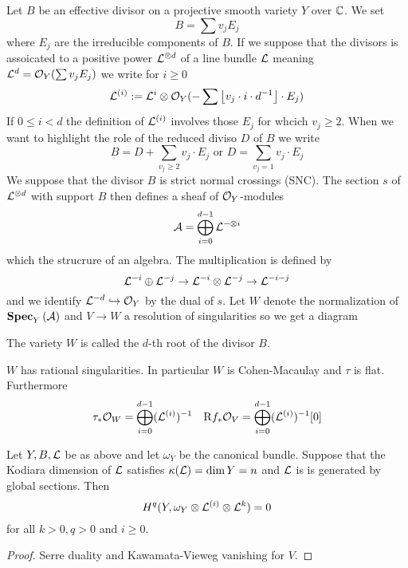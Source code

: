 \documentclass[12pt]{article}
\newcommand{\R}{\mathrm{R}}
\begin{document}
Let $B$ be an effective divisor on a projective smooth variety $Y$ over $\mathbb{C}$. We set
\[ B = \sum v_j E_j \]
where $E_j$ are the irreducible components of $B$. If we suppose that the divisors is assoicated to a positive power $\mathcal{L}^{\otimes d}$ of a line bundle $\mathcal{L}$ meaning $\mathcal{L}^d = \mathcal{O}_{Y}(\sum v_j E_j)$ we write for $i \ge 0$
\[ \mathcal{L}^{(i)} := \mathcal{L}^i \otimes \mathcal{O}_{Y}(-\sum \left\lfloor  v_j \cdot i \cdot d^{-1} \right\rfloor \cdot E_j) \]
If $0 \le i < d$ the definition of $\mathcal{L}^{(i)}$ involves those $E_j$ for whcich $v_j \ge 2$. When we want to highlight the role of the reduced diviso $D$ of $B$ we write
\[ B = D + \sum_{v_j \ge 2} v_j \cdot E_j \text{ or } D = \sum_{v_j = 1} v_j \cdot E_j \]
We suppose that the divisor $B$ is strict normal crossings (SNC). The section $s$ of $\mathcal{L}^{\otimes d}$ with support $B$ then defines a sheaf of $\mathcal{O}_{Y}$-modules
\[ \mathcal{A} = \bigoplus_{i = 0}^{d-1} \mathcal{L}^{-\otimes i} \]
which the strucrure of an algebra. The multiplication is defined by
\[ \mathcal{L}^{-i} \oplus \mathcal{L}^{-j} \to \mathcal{L}^{-i} \otimes \mathcal{L}^{-j} \to \mathcal{L}^{-i -j} \]
and we identify $\mathcal{L}^{-d} \hookrightarrow \mathcal{O}_{Y}$ by the dual of $s$. Let $W$ denote the normalization of $\mathbf{Spec}_{Y}\left( \mathcal{A} \right)$ and $V \to W$ a resolution of singularities so we get a diagram
\begin{center}
\end{center}
The variety $W$ is called the $d$-th root of the divisor $B$. 

\begin{lemma}
$W$ has rational singularities. In particular $W$ is Cohen-Macaulay and $\tau$ is flat. Furthermore
\[ \tau_* \struct{W} = \bigoplus_{i = 0}^{d-1} (\L^{(i)})^{-1} \quad \R f_* \struct{V} = \bigoplus_{i = 0}^{d-1} (\L^{(i)})^{-1} [0] \]
\end{lemma}

\begin{theorem}
Let $Y, B, \mathcal{L}$ be as above and let $\omega_Y$ be the canonical bundle. Suppose that the Kodiara dimension of $\mathcal{L}$ satisfies $\kappa(\mathcal{L}) = \dim{Y} = n$ and $\mathcal{L}$ is is generated by global sections. Then
\[ H^q(Y, \omega_Y \otimes \mathcal{L}^{(i)} \otimes \mathcal{L}^k) = 0 \]
for all $k > 0, q > 0$ and $i \ge 0$.
\end{theorem}

\begin{proof}
Serre duality and Kawamata-Vieweg vanishing for $V$.
\end{proof}
\end{document}
